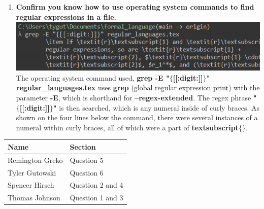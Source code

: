 \documentclass{article}
\begin{document}
\begin{enumerate}
    \medskip

    \item \textbf{Confirm you know how to use operating system commands to find
            regular expressions in a file.}	\\
	\medskip
	\includegraphics{regex_proof} \\
	The operating system command used, \textbf{grep -E "$\{$[[:digit:]]$\}$" regular\_languages.tex} uses \textbf{grep} (global regular expression print) with the parameter \textbf{-E}, which is shorthand for \textbf{--regex-extended}. The regex phrase \textbf{"$\{$[[:digit:]]$\}$"} is then searched, which is any numeral inside of curly braces. As shown on the four lines below the command, there were several instances of a numeral within curly braces, all of which were a part of \textbf{textsubscript$\{$$\}$}. \\


    \medskip


    \medskip
\end{enumerate}

\pagebreak

\begin{center}
    \begin{tabular}{|p{3cm}|p{6cm}|}
        \hline
        \textbf{Name} & \textbf{Section} \\
        \hline
        Remington Greko &  Question 5\\
        \hline
        Tyler Gutowski &  Question 6\\
        \hline
        Spencer Hirsch &  Question 2 and 4\\
        \hline
        Thomas Johnson &  Question 1 and 3\\
        \hline
    \end{tabular}
\end{center}
\end{document}
